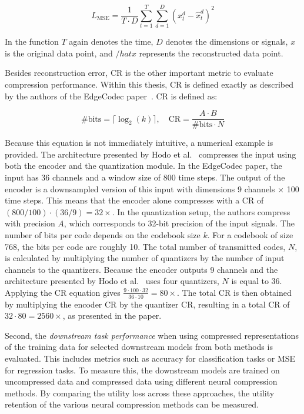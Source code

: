 \begin{equation}
L_{\mathrm{MSE}} = \frac{1}{T \cdot D} \sum_{t=1}^{T} \sum_{d=1}^{D} \left( x_t^d - \hat{x}_t^d \right)^2
\end{equation}

In the function $T$ again denotes the time, $D$ denotes the dimensions or signals, $x$ is the original data point, and $/hat{x}$ represents the reconstructed data point. 

Besides reconstruction error, CR is the other important metric to evaluate compression performance. Within this thesis, CR is defined exactly as described by the authors of the EdgeCodec paper~\cite{Hodo2025}. CR is defined as:

\begin{equation}
\#\text{bits} = \lceil \log_2(k) \rceil, \quad \text{CR} = \frac{A \cdot B}{\#\text{bits} \cdot N}
\end{equation}

Because this equation is not immediately intuitive, a numerical example is provided. The architecture presented by Hodo et al.~\cite{Hodo2025} compresses the input using both the encoder and the quantization module. In the EdgeCodec paper, the input has 36 channels and a window size of 800 time steps. The output of the encoder is a downsampled version of this input with dimensions 9 channels $\times$ 100 time steps. This means that the encoder alone compresses with a CR of $(800/100) \cdot (36/9) = 32\times$. In the quantization setup, the authors compress with precision $A$, which corresponds to 32-bit precision of the input signals. The number of bits per code depends on the codebook size $k$. For a codebook of size 768, the bits per code are roughly 10. The total number of transmitted codes, $N$, is calculated by multiplying the number of quantizers by the number of input channels to the quantizers. Because the encoder outputs 9 channels and the architecture presented by Hodo et al.~\cite{Hodo2025} uses four quantizers, $N$ is equal to 36. Applying the CR equation gives $\frac{9 \cdot 100 \cdot 32}{36 \cdot 10} = 80\times$. The total CR is then obtained by multiplying the encoder CR by the quantizer CR, resulting in a total CR of $32 \cdot 80 = 2560\times$, as presented in the paper.

Second, the \textit{downstream task performance} when using compressed representations of the training data for selected downstream models from both methods is evaluated. This includes metrics such as accuracy for classification tasks or MSE for regression tasks. To measure this, the downstream models are trained on uncompressed data and compressed data using different neural compression methods. By comparing the utility loss across these approaches, the utility retention of the various neural compression methods can be measured.

